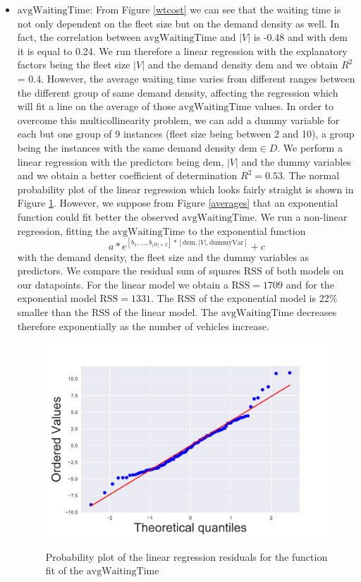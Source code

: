 \documentclass[12pt,a4paper]{article}
\begin{document}
\begin{itemize}
\item $\text{avgWaitingTime}$: From Figure \ref{wtcost} we can see that the waiting time is not only dependent on the fleet size but on the demand density as well. In fact, the correlation between $\text{avgWaitingTime}$ and $|V|$ is -0.48 and with $\text{dem}$ it is equal to 0.24. We run therefore a linear regression with the explanatory factors being the fleet size $|V|$ and the demand density $\text{dem}$ and we obtain $R^{2}$ = 0.4. However, the average waiting time varies from different ranges between the different group of same demand density, affecting the regression which will fit a line on the average of those $\text{avgWaitingTime}$ values. In order to overcome this multicollinearity problem, we can add a dummy variable for each but one group of 9 instances (fleet size being between 2 and 10), a group being the instances with the same demand density $\text{dem} \in D$. We perform a linear regression with the predictors being $\text{dem}$, $|V|$ and the dummy variables and we obtain a better coefficient of determination $R^{2} = 0.53$. The normal probability plot of the linear regression which looks fairly straight is shown in Figure \ref{probaplot}. However, we suppose from Figure \ref{averages} that an exponential function could fit better the observed $\text{avgWaitingTime}$. We run a non-linear regression, fitting the $\text{avgWaitingTime}$ to the exponential function 
\begin{equation}\label{expfun}
a * e^{[b_{1},...,b_{|D|+2}]*[\text{dem},|V|,\text{dummyVar}]}+c
\end{equation}
with the demand density, the fleet size and the dummy variables as predictors. We compare the residual sum of squares $\text{RSS}$ of both models on our datapoints. For the linear model we obtain a $\text{RSS} =   1709$ and for the exponential model $\text{RSS} = 1331$. The $\text{RSS}$ of the exponential model is 22\% smaller than the $\text{RSS}$ of the linear model. The $\text{avgWaitingTime}$ decreases therefore exponentially as the number of vehicles increase.

\begin{figure}[h] 
  \centering
  \caption{Probability plot of the linear regression residuals for the function fit of the $\text{avgWaitingTime}$}
\includegraphics[scale=0.4]{./images/probaplot.pdf}
\label{probaplot}
\end{figure}


\end{itemize}
\end{document}
